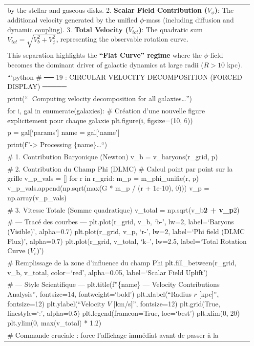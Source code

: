 \documentclass[
]{article}
\begin{document}
{\begin{longtable}[]{@{}
  >{\raggedright\arraybackslash}p{}@{}}
by the stellar and gaseous disks. 2. \textbf{Scalar Field Contribution
(\(V_\phi\))}: The additional velocity generated by the unified
\(\phi\)-mass (including diffusion and dynamic coupling). 3.
\textbf{Total Velocity (\(V_{tot}\))}: The quadratic sum
\(V_{tot} = \sqrt{V_b^2 + V_\phi^2}\), representing the observable
rotation curve. \\
This separation highlights the \textbf{``Flat Curve'' regime} where the
\(\phi\)-field becomes the dominant driver of galactic dynamics at large
radii (\(R > 10\) kpc). \\
```python \# ── 19 : CIRCULAR VELOCITY DECOMPOSITION (FORCED DISPLAY)
───── \\
print(``🚀 Computing velocity decomposition for all
galaxies\ldots{}'') \\
for i, gal in enumerate(galaxies): \# Création d'une nouvelle figure
explicitement pour chaque galaxie plt.figure(i, figsize=(10, 6)) \\
p = gal{[}`params'{]} name = gal{[}`name'{]} \\
print(f''-\textgreater{} Processing \{name\}\ldots``) \\
\# 1. Contribution Baryonique (Newton) v\_b = v\_baryons(r\_grid, p) \\
\# 2. Contribution du Champ Phi (DLMC) \# Calcul point par point sur la
grille v\_p\_vals = {[}{]} for r in r\_grid: m\_p = m\_phi\_unifie(r, p)
v\_p\_vals.append(np.sqrt(max(G * m\_p / (r + 1e-10), 0))) v\_p =
np.array(v\_p\_vals) \\
\# 3. Vitesse Totale (Somme quadratique) v\_total =
np.sqrt(v\_b\textbf{2 + v\_p}2) \\
\# --- Tracé des courbes --- plt.plot(r\_grid, v\_b, `b-', lw=2,
label=`Baryons (Visible)', alpha=0.7) plt.plot(r\_grid, v\_p, `r-',
lw=2, label=`Phi field (DLMC Flux)', alpha=0.7) plt.plot(r\_grid,
v\_total, `k--', lw=2.5, label=`Total Rotation Curve (\(V_c\))') \\
\# Remplissage de la zone d'influence du champ Phi
plt.fill\_between(r\_grid, v\_b, v\_total, color=`red', alpha=0.05,
label=`Scalar Field Uplift') \\
\# --- Style Scientifique --- plt.title(f''\{name\} --- Velocity
Contributions Analysis'', fontsize=14, fontweight=`bold')
plt.xlabel(``Radius \(r\) {[}kpc{]}'', fontsize=12)
plt.ylabel(``Velocity \(V\) {[}km/s{]}'', fontsize=12) plt.grid(True,
linestyle=`:', alpha=0.5) plt.legend(frameon=True, loc=`best')
plt.xlim(0, 20) plt.ylim(0, max(v\_total) * 1.2) \\
\# Commande cruciale : force l'affichage immédiat avant de passer à la

\end{longtable}}
\end{document}
